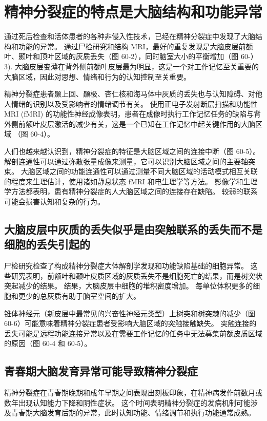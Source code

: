 \section{精神分裂症的特点是大脑结构和功能异常}
通过死后检查和活体患者的各种非侵入性技术，已经在精神分裂症中发现了大脑结构和功能的异常。 通过尸检研究和结构 MRI，最好的重复发现是大脑皮层前额叶、颞叶和顶叶区域的灰质丢失（图 60-2），同时脑室大小的平衡增加（图 60-） 3). 大脑皮层变薄在背外侧前额叶皮层最为明显，这是一个对工作记忆至关重要的大脑区域，因此对思想、情绪和行为的认知控制至关重要。

精神分裂症患者颞上回、颞极、杏仁核和海马体中灰质的丢失也与认知障碍、对他人情绪的识别以及受影响者的情绪调节有关。 使用正电子发射断层扫描和功能性 MRI (fMRI) 的功能性神经成像表明，患者在成像时执行工作记忆任务的缺陷与背外侧前额叶皮层激活的减少有关，这是一个已知在工作记忆中起关键作用的大脑区域 （图 60-4）。

人们也越来越认识到，精神分裂症的特征是大脑区域之间的连接中断（图 60-5）。 解剖连通性可以通过弥散张量成像来测量，它可以识别大脑区域之间的主要轴突束。 大脑区域之间的功能连通性可以通过测量不同大脑区域的活动模式相互关联的程度来生理估计，使用诸如静息状态 fMRI 和电生理学等方法。 影像学和生理学方法都表明，患有精神分裂症的人大脑区域之间的连接存在缺陷。 较弱的联系可能会损害认知和复杂的行为。

\subsection{大脑皮层中灰质的丢失似乎是由突触联系的丢失而不是细胞的丢失引起的}
尸检研究检查了构成精神分裂症大体解剖学发现和功能缺陷基础的细胞异常。 这些研究表明，前额叶和颞叶皮质区域的灰质丢失不是细胞死亡的结果，而是树突状突起减少的结果。 结果，大脑皮层中细胞的堆积密度增加。 每单位体积更多的细胞和更少的总灰质有助于脑室空间的扩大。

锥体神经元（新皮层中最常见的兴奋性神经元类型）上树突和树突棘的减少（图 60-6）可能意味着精神分裂症患者受影响大脑区域的突触接触缺失。 突触连接的丢失可能是远程功能连接异常以及在需要工作记忆的任务中无法募集前额皮质区域的原因（图 60-4 和 60-5）。

\subsection{青春期大脑发育异常可能导致精神分裂症}

精神分裂症在青春期晚期和成年早期之间表现出刻板印象，在精神病发作前数月或数年出现认知能力下降和阴性症状。 这个时间表明精神分裂症的发病机制可能涉及青春期大脑发育后期的异常，此时认知功能、情绪调节和执行功能通常成熟。

